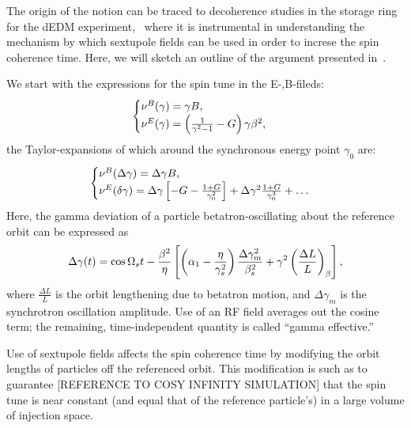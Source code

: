 \documentclass{article}
\begin{document}
The origin of the notion can be traced to decoherence studies in the storage ring for the dEDM experiment,~\cite{Senichev:StorageRingMethod} where it is instrumental in understanding the mechanism by which sextupole fields can be used in order to increse the spin coherence time. Here, we will sketch an outline of the argument presented in~\cite{SenichevStorageRingMethod}.

We start with the expressions for the spin tune in the E-,B-fileds:
\begin{equation}\label{eq:spin_tune}
  \begin{cases}
    \nu^B(\gamma) = \gamma B,\\
    \nu^E(\gamma) = \bkt{\frac{1}{\gamma^2-1}-G}\gamma\beta^2,
  \end{cases}
\end{equation}
the Taylor-expansions of which around the synchronous energy point $\gamma_0$ are:
\begin{equation}
  \begin{cases}
    \nu^B(\Delta\gamma) = \Delta\gamma B,\\
    \nu^E(\delta\gamma) = \Delta\gamma\bkt*{-G - \frac{1+G}{\gamma_0^2}} + \Delta\gamma^2\frac{1+G}{\gamma_0^3} + \dots
  \end{cases}
\end{equation}
Here, the gamma deviation of a particle betatron-oscillating about the reference orbit can be expressed as
\begin{equation}\label{eq:delta_gamma}
  \Delta\gamma(t) = \cos\Omega_s t - \frac{\beta^2}{\eta}\bkt*{\bkt{\alpha_1 - \frac{\eta}{\gamma_s^2}}\frac{\Delta\gamma_m^2}{\beta_s^2} + \gamma^2\bkt{\frac{\Delta L}{L}}_\beta},
\end{equation}
where $\frac{\Delta L}{L}$ is the orbit lengthening due to betatron motion, and $\Delta\gamma_m$ is the synchrotron oscillation amplitude. Use of an RF field averages out the cosine term; the remaining, time-independent quantity is called ``gamma effective.''

Use of sextupole fields affects the spin coherence time by modifying the orbit lengths of particles off the referenced orbit. This modification is such as to guarantee [REFERENCE TO COSY INFINITY SIMULATION] that the spin tune is near constant (and equal that of the reference particle's) in a large volume of injection space.
\end{document}
